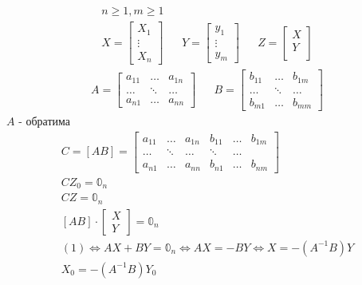 \documentclass[main]{subfiles}
\begin{document}
      \begin{theorem}
         \begin{align*}
          n \geq 1, m \geq 1 \\
           X = \begin{bmatrix*}
            X_1 \\
            \vdots \\
            X_n
         \end{bmatrix*} &&  Y = \begin{bmatrix*}
            y_1 \\
            \vdots \\
            y_m
         \end{bmatrix*} &&
         Z = \begin{bmatrix*}
            X \\
            Y \\
         \end{bmatrix*} 
      \end{align*}
      \begin{align*}
         A = \begin{bmatrix*}
            a_{11} & \ldots & a_{1n} \\
            \ldots & \ddots & \ldots \\
            a_{n1} & \ldots & a_{nn}
         \end{bmatrix*} &&
         B = \begin{bmatrix*}
            b_{11} & \ldots & b_{1m} \\
            \ldots & \ddots & \ldots \\
            b_{m1} & \ldots & b_{mm}
         \end{bmatrix*} 
      \end{align*}
      $A$ - обратима
      \begin{gather*}
          C= [AB]  = \begin{bmatrix*}
            a_{11} & \ldots & a_{1n} & b_{11} & \ldots & b_{1m} \\
            \ldots & \ddots & \ldots & \ddots & \ldots \\
            a_{n1} & \ldots & a_{nn} & b_{n1} & \ldots & b_{nm}
         \end{bmatrix*} \\
       CZ_0 = \mathbb{0}_n \\
       CZ = \mathbb{0}_n \\
       [AB] \cdot \begin{bmatrix*}
         X \\
         Y
      \end{bmatrix*} = \mathbb{0}_n \tag{1} \\
      (1) \Leftrightarrow AX + BY = \mathbb{0}_n \Leftrightarrow AX = -BY \Leftrightarrow X
      = -(A^{-1}B)Y \tag{2}  \\
       X_0 = -(A^{-1}B)Y_0 \tag{2'} 
      \end{gather*}
      \end{theorem}
\end{document}
